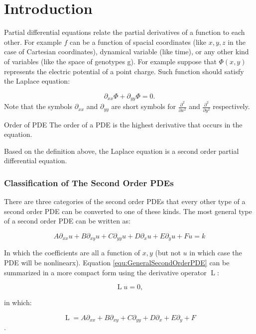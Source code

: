 \chapter{Introduction}
Partial differential equations relate the partial derivatives of a function to each other. For example $f$ can be a function of spacial coordinates (like $x,y,z$ in the case of Cartesian coordinates), dynamical variable (like time), or any other kind of variables (like the space of genotypes g). For example suppose that $ \Phi(x,y) $ represents the electric potential of a point charge. Such function should satisfy the Laplace equation:

\[	 \partial_{xx} \Phi + \partial_{yy} \Phi = 0.	\]
Note that the symbols $ \partial_{xx} $ and $ \partial_{yy} $ are short symbols for $ \frac{\partial^2}{\partial x^2} $ and $ \frac{\partial^2}{\partial y^2} $ respectively.

\begin{definition}{Order of PDE}
	The order of a PDE is the highest derivative that occurs in the equation. 
\end{definition}

Based on the definition above, the Laplace equation is a second order partial differential equation. 

\subsection{Classification of The Second Order PDEs }

There are three categories of the second order PDEs that every other type of a second order PDE can be converted to one of these kinds. The most general type of a second order PDE can be written as:

\begin{equation}
	A \partial_{xx} u + B \partial_{xy} u + C \partial_{yy} u + D \partial_{x} u + E \partial_{y} u + F u = k
	\label{equ:GeneralSecondOrderPDE}
\end{equation}

In which the coefficients are all a function of $x,y$ (but not $ u $ in which case the PDE will be nonlinearx). Equation \ref{equ:GeneralSecondOrderPDE} can be summarized in a more compact form using the derivative operator $ \operatorname{L} $: 

\[	 \operatorname{L} u = 0,	\]

in which:

\[  \operatorname{L} = A \partial_{xx} + B \partial_{xy} + C \partial_{yy} + D \partial_{x} + E \partial_{y} + F \].

